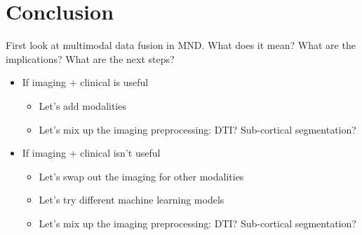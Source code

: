 \section{Conclusion}
First look at multimodal data fusion in MND. What does it mean? What are the implications? What are the next steps?
\begin{itemize}
    \item If imaging + clinical is useful
    \begin{itemize}
        \item Let's add modalities
        \item Let's mix up the imaging preprocessing: DTI? Sub-cortical segmentation?
    \end{itemize}
    \item If imaging + clinical isn't useful
    \begin{itemize}
        \item Let's swap out the imaging for other modalities
        \item Let's try different machine learning models
        \item Let's mix up the imaging preprocessing: DTI? Sub-cortical segmentation?
    \end{itemize}
\end{itemize}
